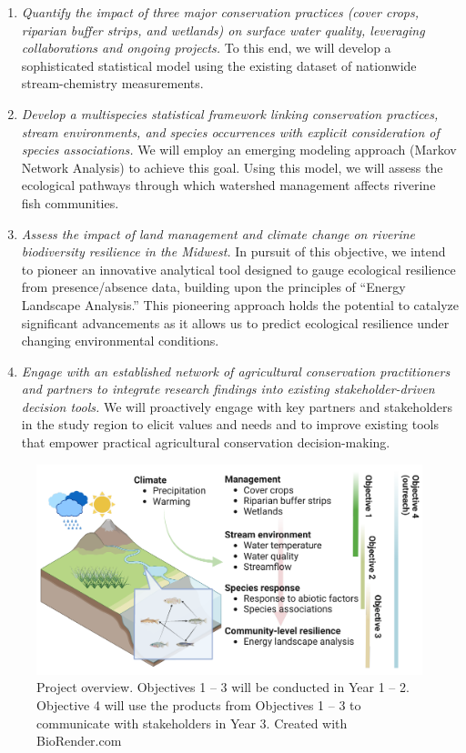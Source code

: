 \documentclass[12pt, class=article, crop=false]{standalone}
\begin{document}
\begin{enumerate}
    \item \textit{Quantify the impact of three major conservation practices (cover crops, riparian buffer strips, and wetlands) on surface water quality, leveraging collaborations and ongoing projects.} To this end, we will develop a sophisticated statistical model using the existing dataset of nationwide stream-chemistry measurements.

    \item \textit{Develop a multispecies statistical framework linking conservation practices, stream environments, and species occurrences with explicit consideration of species associations.} We will employ an emerging modeling approach (Markov Network Analysis) to achieve this goal. Using this model, we will assess the ecological pathways through which watershed management affects riverine fish communities.

    \item \textit{Assess the impact of land management and climate change on riverine biodiversity resilience in the Midwest.} In pursuit of this objective, we intend to pioneer an innovative analytical tool designed to gauge ecological resilience from presence/absence data, building upon the principles of ``Energy Landscape Analysis.'' This pioneering approach holds the potential to catalyze significant advancements as it allows us to predict ecological resilience under changing environmental conditions.
    
    \item \textit{Engage with an established network of agricultural conservation practitioners and partners to integrate research findings into existing stakeholder-driven decision tools.} We will proactively engage with key partners and stakeholders in the study region to elicit values and needs and to improve existing tools that empower practical agricultural conservation decision-making.
\end{enumerate}

\begin{figure}
\centering
\includegraphics[scale=0.65]{output/fig_overview.pdf}
\caption{Project overview.
Objectives 1 -- 3 will be conducted in Year 1 -- 2.
Objective 4 will use the products from Objectives 1 -- 3 to communicate with stakeholders in Year 3.
Created with BioRender.com}
\label{fig:overview}
\end{figure}
\end{document}
